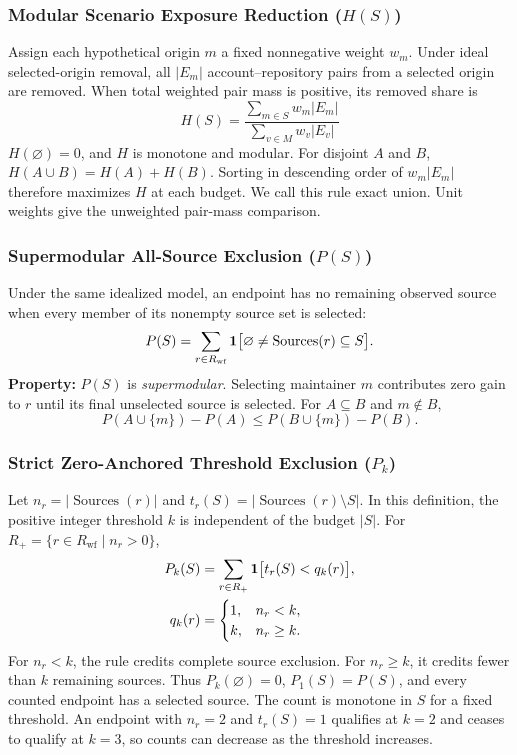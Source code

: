 \subsubsection{Modular Scenario Exposure Reduction ($H(S)$)}
Assign each hypothetical origin $m$ a fixed nonnegative weight $w_m$. Under ideal selected-origin removal, all $|E_m|$ account--repository pairs from a selected origin are removed. When total weighted pair mass is positive, its removed share is
\begin{equation}
H(S) = \frac{\sum_{m \in S} w_m |E_m|}{\sum_{v \in M} w_v |E_v|}
\end{equation}
$H(\varnothing)=0$, and $H$ is monotone and modular. For disjoint $A$ and $B$, $H(A\cup B)=H(A)+H(B)$. Sorting in descending order of $w_m|E_m|$ therefore maximizes $H$ at each budget. We call this rule exact union. Unit weights give the unweighted pair-mass comparison.

\subsubsection{Supermodular All-Source Exclusion ($P(S)$)}
Under the same idealized model, an endpoint has no remaining observed source when every member of its nonempty source set is selected:
\begin{equation}
P(S) = \sum_{r \in R_{\text{wf}}}
  \mathbf{1}\bigl[\varnothing \ne \operatorname{Sources}(r) \subseteq S\bigr].
\end{equation}
\textbf{Property:} $P(S)$ is \textit{supermodular}. Selecting maintainer $m$ contributes zero gain to $r$ until its final unselected source is selected. For $A\subseteq B$ and $m\notin B$,
\begin{equation}
P(A \cup \{m\}) - P(A) \le P(B \cup \{m\}) - P(B).
\end{equation}

\subsubsection{Strict Zero-Anchored Threshold Exclusion ($P_k$)}
Let $n_r=\lvert\operatorname{Sources}(r)\rvert$ and
$t_r(S)=\lvert\operatorname{Sources}(r)\setminus S\rvert$. In this definition, the positive integer threshold $k$ is independent of the budget $|S|$. For $R_+=\{r\in R_{\text{wf}}\mid n_r>0\}$,
\begin{equation}
\begin{aligned}
P_k(S) &= \sum_{r\in R_+} \mathbf{1}\bigl[t_r(S)<q_k(r)\bigr],\\
q_k(r) &=
  \begin{cases}
    1, & n_r<k,\\
    k, & n_r\ge k .
  \end{cases}
\end{aligned}
\label{eq:strict_quorum}
\end{equation}
For $n_r<k$, the rule credits complete source exclusion. For $n_r\ge k$, it credits fewer than $k$ remaining sources. Thus $P_k(\varnothing)=0$, $P_1(S)=P(S)$, and every counted endpoint has a selected source. The count is monotone in $S$ for a fixed threshold. An endpoint with $n_r=2$ and $t_r(S)=1$ qualifies at $k=2$ and ceases to qualify at $k=3$, so counts can decrease as the threshold increases.

